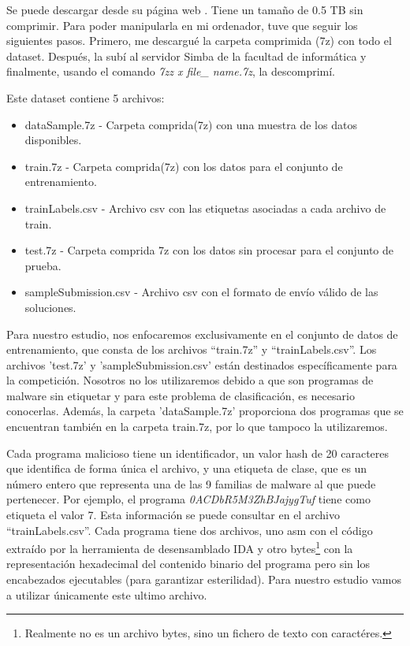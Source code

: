 Se puede descargar desde su página web \citep{kagglebig2015}. Tiene un tamaño de 0.5 TB sin comprimir. Para poder manipularla en mi ordenador, tuve que seguir los siguientes pasos. Primero, me descargué la carpeta comprimida (7z) con todo el dataset. Después, la subí al servidor Simba de la facultad de informática y finalmente, usando el comando \textit{7zz x file\_ name.7z}, la descomprimí. 


Este dataset contiene 5 archivos:
\begin{itemize}
\item dataSample.7z - Carpeta comprida(7z) con una muestra de los datos disponibles.
\item train.7z - Carpeta comprida(7z) con los datos para el conjunto de entrenamiento.
\item trainLabels.csv - Archivo csv con las etiquetas asociadas a cada archivo de train.
\item test.7z - Carpeta comprida 7z con los datos sin procesar para el conjunto de prueba.
\item sampleSubmission.csv - Archivo csv con el formato de envío válido de las soluciones.
\end{itemize}



Para nuestro estudio, nos enfocaremos exclusivamente en el conjunto de datos de entrenamiento, que consta de los archivos ``train.7z'' y ``trainLabels.csv''. Los archivos 'test.7z' y 'sampleSubmission.csv' están destinados específicamente para la competición. Nosotros no los utilizaremos debido a que son programas de malware sin etiquetar y para este problema de clasificación, es necesario conocerlas.  Además, la carpeta 'dataSample.7z' proporciona dos programas que se encuentran también en la carpeta train.7z, por lo que tampoco la utilizaremos. 


Cada programa malicioso tiene un identificador, un valor hash de 20 caracteres que identifica de forma única el archivo, y una etiqueta de clase, que es un número entero que representa una de las 9 familias de malware al que puede pertenecer. Por ejemplo, el programa \textit{0ACDbR5M3ZhBJajygTuf} tiene como etiqueta el valor 7. Esta información se puede consultar en el archivo ``trainLabels.csv''. Cada programa tiene dos archivos, uno asm con el código extraído por la herramienta de desensamblado IDA y otro bytes\footnote{Realmente no es un archivo bytes, sino un fichero de texto con caractéres.} con la representación hexadecimal del contenido binario del programa pero sin los encabezados ejecutables (para garantizar esterilidad). Para nuestro estudio vamos a utilizar únicamente este ultimo archivo. 

